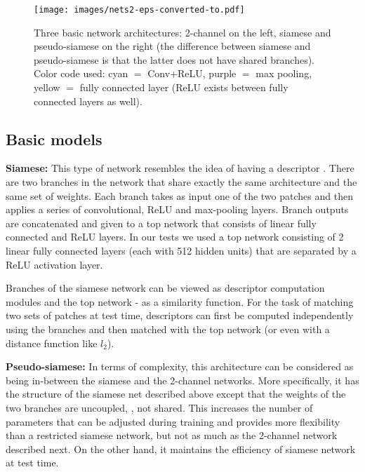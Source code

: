 \documentclass[10pt,twocolumn,letterpaper]{article}
\newcommand*{\USEIMAGES}{}
\begin{document}
\ifdefined\USEIMAGES
\begin{figure}
  \begin{center}
  \texttt{[image: images/nets2-eps-converted-to.pdf]}
  \end{center}
  \vspace{-5pt}
  \caption{Three basic network architectures: 2-channel on the left, siamese and pseudo-siamese on the right (the difference between siamese and pseudo-siamese is that the latter does not have shared branches). Color code used: cyan $=$ Conv+ReLU, purple $=$ max pooling, yellow $=$ fully connected layer (ReLU  exists between fully connected layers as well).}
  \label{fig:basic_models}
  \vspace{-5pt}
\end{figure}
\fi

\subsection{Basic models}\label{sec:basic_models}

\textbf{Siamese:} This type of network resembles the idea of having a descriptor \cite{siamese, chopra-05}. There are two branches in the network that share exactly the same architecture and the same set of weights. Each branch takes as input one of the two patches and then applies a series of convolutional, ReLU and max-pooling layers. 
Branch outputs are concatenated and given to 
a top network that consists of linear fully connected and ReLU layers. In our tests we used a top network consisting of 2 linear fully connected layers (each with 512 hidden units) that are separated by a ReLU activation layer.
%
%
%
%
%
%
%
%

Branches of the siamese network can be viewed as descriptor computation modules and 
the top network - as a similarity function. For the task of matching two sets of patches at test time, descriptors can first be computed independently using the branches and then matched with the top 
network (or even with a distance function like $l_2$).

\textbf{Pseudo-siamese:} In terms of complexity, this architecture can be considered as being in-between the siamese and  the 2-channel  networks.
More specifically, it has the structure of the siamese net described above except that the weights of the two branches are
 uncoupled, \ie, not shared. This increases the number of parameters that can be adjusted during training and provides more flexibility than
a restricted siamese network, but not as much as the 2-channel network described next. On the other hand, it maintains the efficiency of siamese network at test time.
%
\end{document}
